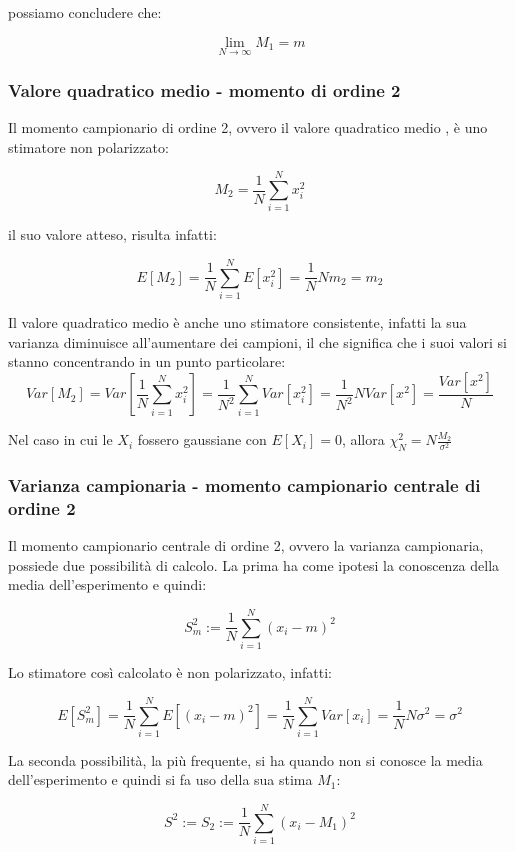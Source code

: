possiamo concludere che:

    \[ \lim_{N \rightarrow \infty} M_1= m \]

\subsubsection{Valore quadratico medio - momento di ordine 2}%
Il momento campionario di ordine 2, ovvero il valore quadratico medio , è uno stimatore non polarizzato:

    \[ M_2 = \frac{1}{N} \sum_{i=1}^{N}{x_i^2} \]

il suo valore atteso, risulta infatti:

    \[ E[M_2]=\frac{1}{N} \sum_{i=1}^{N} {E[x_i^2]}=\frac{1}{N} N m_2=m_2 \]
    
Il valore quadratico medio è anche uno stimatore consistente, infatti la sua varianza diminuisce all'aumentare dei campioni, il che significa che i suoi valori si stanno concentrando in un punto particolare:
  \[ Var[M_2]=Var[\frac{1}{N} \sum_{i=1}^{N}{x_i^2}]=\frac{1}{N^2}\sum_{i=1}^{N}{Var[x_i^2]}=\frac{1}{N^2}NVar[x^2]=\frac{Var[x^2]}{N} \]

Nel caso in cui le $X_i$ fossero gaussiane con $E[X_i]=0$, allora $\chi_N^2=N \frac{M_2}{\sigma^2}$

\subsubsection{Varianza campionaria - momento campionario centrale di ordine 2} %
Il momento campionario centrale di ordine 2, ovvero la varianza campionaria, possiede due possibilità di calcolo. La prima ha come ipotesi la conoscenza della media dell'esperimento e quindi:

    \[ S_m^2:=\frac{1}{N} \sum_{i=1}^{N}{(x_i-m)^2} \]
    
Lo stimatore così calcolato è non polarizzato, infatti:

    \[E[S_m^2]=\frac{1}{N} \sum_{i=1}^{N}{E[(x_i-m)^2]}=\frac{1}{N} \sum_{i=1}^{N}{Var[x_i]}=\frac{1}{N} N \sigma^2=\sigma^2 \]

La seconda possibilità, la più frequente, si ha quando non si conosce la media dell'esperimento e quindi si fa uso della sua stima $M_1$:

    \[ S^2:=S_2:=\frac{1}{N} \sum_{i=1}^{N}{(x_i-M_1)^2} \]

